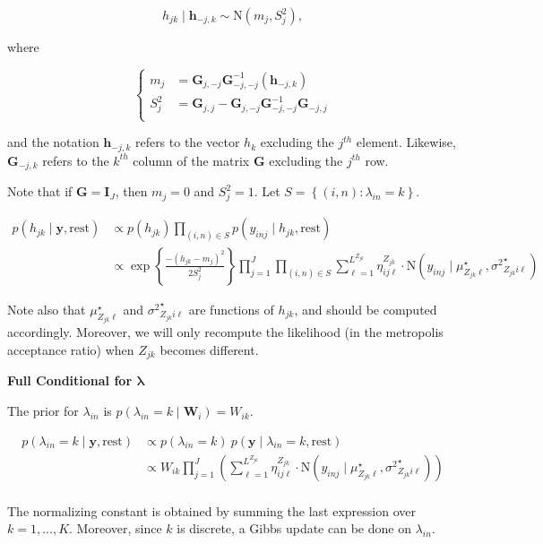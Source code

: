 \documentclass[12pt,]{article}
\newcommand{\p}[1]{\left(#1\right)}
\newcommand{\bc}[1]{ \left\{#1\right\} }
\newcommand{\N}{ \mathcal{N} }
\newcommand{\I}{\mathrm{\mathbf{I}}}
\def\N{\text{N}}
\def\lin{\lambda_{in}}
\def\y{\bm{y}}
\def\mus{\mu^\star}
\def\sss{{\sigma^2}^\star}
\def\rest{\text{rest}}
\def\h{\bm{h}}
\begin{document}
\[
h_{jk}  \mid \h_{-j,k} \sim \N(m_j, S^2_j),
\]

where

\[
\begin{cases}
m_j &= \bm G_{j,-j} \bm G_{-j,-j}^{-1}(\h_{-j,k})\\
S_j^2 &= \bm G_{j,j} - \bm G_{j,-j}\bm G_{-j,-j}^{-1}\bm G_{-j,j}\\
\end{cases}
\]

and the notation \(\h_{-j,k}\) refers to the vector \(h_k\) excluding
the \(j^{th}\) element. Likewise, \(\bm G_{-j,k}\) refers to the
\(k^{th}\) column of the matrix \(\bm G\) excluding the \(j^{th}\) row.

Note that if \(\bm G = \I_J\), then \(m_j=0\) and \(S_j^2 = 1\). Let
\(S = \bc{(i,n)\colon \lin=k}\).

\begin{align*}
p(h_{jk} \mid \y, \rest)  &\propto p(h_{jk}) \prod_{(i,n) \in S} p(y_{inj} \mid h_{jk}, \rest) \\
%
&\propto
\exp\bc{\frac{-(h_{jk} - m_j)^2}{2S_j^2}}
 \prod_{j=1}^J \prod_{(i,n)\in S}
\sum_{\ell=1}^{L^{Z_{jk}}} \eta^{Z_{jk}}_{ij\ell} \cdot
\N(y_{inj} \mid \mus_{Z_{jk}\ell}, \sss_{Z_{jk}i\ell})
\end{align*}


Note also that \(\mus_{Z_{jk}\ell}\) and \(\sss_{Z_{jk}i\ell}\) are
functions of \(h_{jk}\), and should be computed accordingly. Moreover,
we will only recompute the likelihood (in the metropolis acceptance
ratio) when \(Z_{jk}\) becomes different.  
\vspace{2em}


\textbf{Full Conditional for $\bm \lambda$}

The prior for \(\lin\) is \(p(\lin = k \mid \bm W_i) = W_{ik}\).

\begin{align*}
p(\lin=k\mid \y,\rest) &\propto p(\lin=k) ~ p(\y \mid \lin=k, \rest) \\
&\propto W_{ik}
\prod_{j=1}^J 
\p{
  \sum_{\ell=1}^{L^{Z_{jk}}} \eta^{Z_{jk}}_{ij\ell} \cdot
  \N(y_{inj} \mid 
  \mus_{Z_{jk}\ell}, \sss_{Z_{jk}i\ell})
}\\
\end{align*}

The normalizing constant is obtained by summing the last expression over
\(k = 1,...,K\). Moreover, since \(k\) is discrete, a Gibbs update can
be done on \(\lin\).
\end{document}
